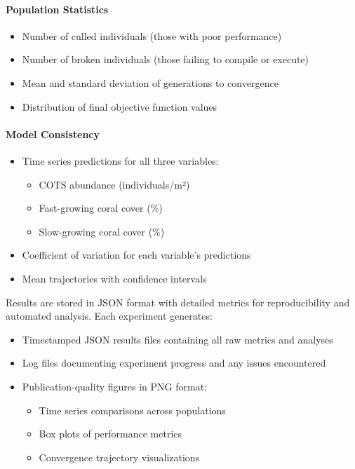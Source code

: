 \paragraph{Population Statistics}
\begin{itemize}
\item Number of culled individuals (those with poor performance)
\item Number of broken individuals (those failing to compile or execute)
\item Mean and standard deviation of generations to convergence
\item Distribution of final objective function values
\end{itemize}

\paragraph{Model Consistency}
\begin{itemize}
\item Time series predictions for all three variables:
  \begin{itemize}
  \item COTS abundance (individuals/m²)
  \item Fast-growing coral cover (\%)
  \item Slow-growing coral cover (\%)
  \end{itemize}
\item Coefficient of variation for each variable's predictions
\item Mean trajectories with confidence intervals
\end{itemize}

Results are stored in JSON format with detailed metrics for reproducibility and automated analysis. Each experiment generates:
\begin{itemize}
\item Timestamped JSON results files containing all raw metrics and analyses
\item Log files documenting experiment progress and any issues encountered
\item Publication-quality figures in PNG format:
  \begin{itemize}
  \item Time series comparisons across populations
  \item Box plots of performance metrics
  \item Convergence trajectory visualizations
  \end{itemize}
\end{itemize}

